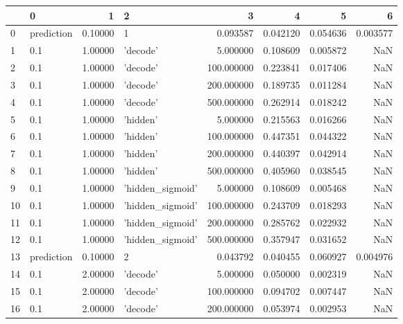 \documentclass[10pt,a4paper]{article}
\author{simulated author}
\begin{document}
\begin{tabular}{llrlrrrr}
\toprule
{} &           0 &         1 &                  2 &           3 &         4 &         5 &         6 \\
\midrule
0    &  prediction &   0.10000 &                  1 &    0.093587 &  0.042120 &  0.054636 &  0.003577 \\
1    &         0.1 &   1.00000 &           'decode' &    5.000000 &  0.108609 &  0.005872 &       NaN \\
2    &         0.1 &   1.00000 &           'decode' &  100.000000 &  0.223841 &  0.017406 &       NaN \\
3    &         0.1 &   1.00000 &           'decode' &  200.000000 &  0.189735 &  0.011284 &       NaN \\
4    &         0.1 &   1.00000 &           'decode' &  500.000000 &  0.262914 &  0.018242 &       NaN \\
5    &         0.1 &   1.00000 &           'hidden' &    5.000000 &  0.215563 &  0.016266 &       NaN \\
6    &         0.1 &   1.00000 &           'hidden' &  100.000000 &  0.447351 &  0.044322 &       NaN \\
7    &         0.1 &   1.00000 &           'hidden' &  200.000000 &  0.440397 &  0.042914 &       NaN \\
8    &         0.1 &   1.00000 &           'hidden' &  500.000000 &  0.405960 &  0.038545 &       NaN \\
9    &         0.1 &   1.00000 &   'hidden\_sigmoid' &    5.000000 &  0.108609 &  0.005468 &       NaN \\
10   &         0.1 &   1.00000 &   'hidden\_sigmoid' &  100.000000 &  0.243709 &  0.018293 &       NaN \\
11   &         0.1 &   1.00000 &   'hidden\_sigmoid' &  200.000000 &  0.285762 &  0.022932 &       NaN \\
12   &         0.1 &   1.00000 &   'hidden\_sigmoid' &  500.000000 &  0.357947 &  0.031652 &       NaN \\
13   &  prediction &   0.10000 &                  2 &    0.043792 &  0.040455 &  0.060927 &  0.004976 \\
14   &         0.1 &   2.00000 &           'decode' &    5.000000 &  0.050000 &  0.002319 &       NaN \\
15   &         0.1 &   2.00000 &           'decode' &  100.000000 &  0.094702 &  0.007447 &       NaN \\
16   &         0.1 &   2.00000 &           'decode' &  200.000000 &  0.053974 &  0.002953 &       NaN \\

\end{tabular}
\end{document}
